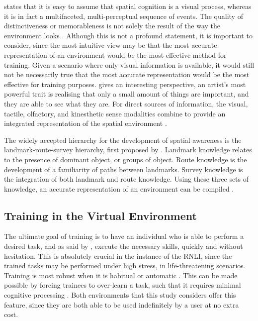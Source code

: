 \documentclass[ %
                    author={Elis Jones},
                supervisor={Dr. Kirsten Cater},
                    degree={BSc},
                     title={The Effect of Presentation Medium on Spatial Cognition},
                  subtitle={in the Virtual Environment},
                      year={2018} ]{dissertation}
\begin{document}
 \cite{osberg} states that it is easy to assume that spatial cognition is a visual process, whereas it is in fact a multifaceted, multi-perceptual sequence of events.  The quality of distinctiveness or memorableness is not solely the result of the way the environment looks \citep{downs}. Although this is not a profound statement, it is important to consider, since the most intuitive view may be that the most accurate representation of an environment would be the most effective method for training. Given a scenario where only visual information is available, it would still not be necessarily true that the most accurate representation would be the most effective for training purposes. \cite{gleick} gives an interesting perspective, an artist's most powerful trait is realising that only a small amount of things are important, and they are able to see what they are. For direct sources of information, the visual, tactile, olfactory, and kinesthetic sense modalities combine to provide an integrated representation of the spatial environment \citep{downs}.

The widely accepted hierarchy for the development of spatial awareness is the landmark-route-survey hierarchy, first proposed by \cite{siegel}.  Landmark knowledge relates to the presence of dominant object, or groups of object. Route knowledge is the development of a familiarity of paths between landmarks. Survey knowledge is the integration of both landmark and route knowledge. Using these three sets of knowledge, an accurate representation of an environment can be compiled \citep{stone}.



\subsection{Training in the Virtual Environment}
The ultimate goal of training is to have an individual who is able to perform a desired task, and as said by \cite{hussein}, execute the necessary skills, quickly and without hesitation. This is absolutely crucial in the instance of the RNLI, since the trained tasks may be performed under high stress, in life-threatening scenarios. Training is most robust when it is habitual or automatic \citep{hussein}. This can be made possible by forcing trainees to over-learn a task, such that it requires minimal cognitive processing  \citep{kirlik}. Both environments that this study considers offer this feature, since they are both able to be used indefinitely by a user at no extra cost. 
\end{document}

